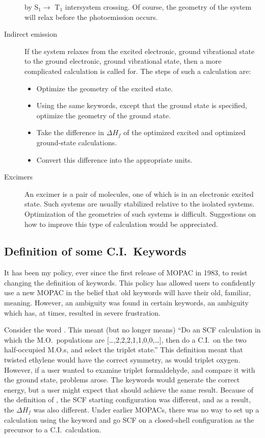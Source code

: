 \begin{description}
by S$_1 \rightarrow $ T$_1$ intersystem crossing.  Of course, the geometry of
the system will relax before the photoemission occurs.
\item[Indirect emission]
If the system relaxes from the excited electronic, ground vibrational state to
the ground electronic, ground vibrational state, then a more complicated
calculation is called for.  The steps of such a calculation are:
\begin{itemize}
\item Optimize the geometry of the excited state.
\item Using the same keywords, except that the ground state is specified,
optimize the geometry of the ground state.
\item Take the difference in $\Delta H_f$ of the optimized excited and optimized
ground-state calculations.
\item Convert this difference into the appropriate units.
\end{itemize}
\item[Excimers]
An excimer is a pair of molecules, one of which is in an electronic excited
state.  Such systems are usually stabilized relative to the isolated systems.
Optimization of the geometries of such systems is difficult.  Suggestions on
how to improve this type of calculation would be appreciated.
\end{description}

\subsection{Definition of some C.I.\ Keywords}\label{chadef}
It has been my policy, ever since the first release of MOPAC in 1983, to resist
changing the definition of keywords.  This policy has allowed users to
confidently use a new MOPAC in the belief that old keywords will have their
old, familiar, meaning.  However, an ambiguity was found in certain keywords,
an ambiguity which has, at times, resulted in severe frustration.

Consider the word .  This meant (but no longer means) ``Do an SCF
calculation in which the M.O.\ populations are [\ldots,2,2,2,1,1,0,0,\ldots],
then do a C.I.\ on the two half-occupied M.O.s, and select the triplet state.''
This definition meant that twisted ethylene would have the correct symmetry, as
would triplet oxygen.  However, if a user wanted to examine triplet
formaldehyde, and compare it with the ground state, problems arose.  The
keywords  would generate the correct energy, but a user
might expect that  should achieve the same result.  Because of
the definition of , the SCF starting configuration was different,
and as a result, the $\Delta H_f$ was also different. Under earlier MOPACs,
there was no way to set up a calculation using the keyword  and
go SCF on a closed-shell configuration as the precursor to a C.I.\
calculation.


